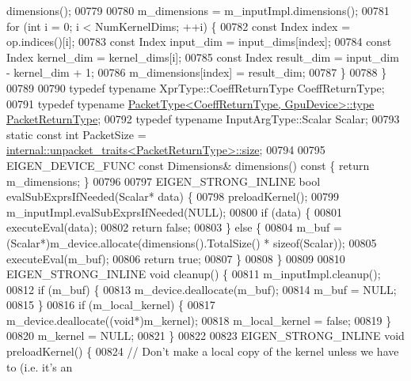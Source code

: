 \begin{DoxyCode}
      dimensions();
00779 
00780     m\_dimensions = m\_inputImpl.dimensions();
00781     \textcolor{keywordflow}{for} (\textcolor{keywordtype}{int} i = 0; i < NumKernelDims; ++i) \{
00782       \textcolor{keyword}{const} Index index = op.indices()[i];
00783       \textcolor{keyword}{const} Index input\_dim = input\_dims[index];
00784       \textcolor{keyword}{const} Index kernel\_dim = kernel\_dims[i];
00785       \textcolor{keyword}{const} Index result\_dim = input\_dim - kernel\_dim + 1;
00786       m\_dimensions[index] = result\_dim;
00787     \}
00788   \}
00789 
00790   \textcolor{keyword}{typedef} \textcolor{keyword}{typename} XprType::CoeffReturnType CoeffReturnType;
00791   \textcolor{keyword}{typedef} \textcolor{keyword}{typename} \hyperlink{group___sparse_core___module}{PacketType<CoeffReturnType, GpuDevice>::type}
       \hyperlink{group___sparse_core___module}{PacketReturnType};
00792   \textcolor{keyword}{typedef} \textcolor{keyword}{typename} InputArgType::Scalar Scalar;
00793   \textcolor{keyword}{static} \textcolor{keyword}{const} \textcolor{keywordtype}{int} PacketSize = 
      \hyperlink{struct_eigen_1_1internal_1_1unpacket__traits}{internal::unpacket\_traits<PacketReturnType>::size};
00794 
00795   EIGEN\_DEVICE\_FUNC \textcolor{keyword}{const} Dimensions& dimensions()\textcolor{keyword}{ const }\{ \textcolor{keywordflow}{return} m\_dimensions; \}
00796 
00797   EIGEN\_STRONG\_INLINE \textcolor{keywordtype}{bool} evalSubExprsIfNeeded(Scalar* data) \{
00798     preloadKernel();
00799     m\_inputImpl.evalSubExprsIfNeeded(NULL);
00800     \textcolor{keywordflow}{if} (data) \{
00801       executeEval(data);
00802       \textcolor{keywordflow}{return} \textcolor{keyword}{false};
00803     \} \textcolor{keywordflow}{else} \{
00804       m\_buf = (Scalar*)m\_device.allocate(dimensions().TotalSize() * \textcolor{keyword}{sizeof}(Scalar));
00805       executeEval(m\_buf);
00806       \textcolor{keywordflow}{return} \textcolor{keyword}{true};
00807     \}
00808   \}
00809 
00810   EIGEN\_STRONG\_INLINE \textcolor{keywordtype}{void} cleanup() \{
00811     m\_inputImpl.cleanup();
00812     \textcolor{keywordflow}{if} (m\_buf) \{
00813       m\_device.deallocate(m\_buf);
00814       m\_buf = NULL;
00815     \}
00816     \textcolor{keywordflow}{if} (m\_local\_kernel) \{
00817       m\_device.deallocate((\textcolor{keywordtype}{void}*)m\_kernel);
00818       m\_local\_kernel = \textcolor{keyword}{false};
00819     \}
00820     m\_kernel = NULL;
00821   \}
00822 
00823   EIGEN\_STRONG\_INLINE \textcolor{keywordtype}{void} preloadKernel() \{
00824     \textcolor{comment}{// Don't make a local copy of the kernel unless we have to (i.e. it's an}

\end{DoxyCode}
